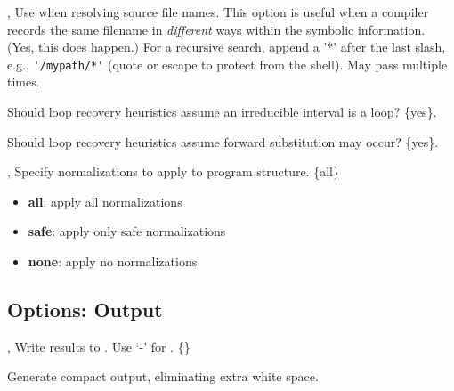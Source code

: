 \documentclass[english]{article}
\begin{document}
\begin{Description}
\item[\OptArg{-I}{path}, \OptArg{--include}{path}] 
Use  when resolving source file names. 
This option is useful when a compiler records the same filename in \emph{different} ways within the symbolic information.
(Yes, this does happen.)
For a recursive search, append a '*' after the last slash, e.g., \verb+'/mypath/*'+ (quote or escape to protect from the shell). 
May pass multiple times.

\item[\OptArg{--loop-intvl}{yes|no}]
Should loop recovery heuristics assume an irreducible interval is a loop? \{yes\}.

\item[\OptArg{--loop-fwd-subst}{yes|no}]
Should loop recovery heuristics assume forward substitution may occur? \{yes\}.

\item[\OptArg{-N}{all|safe|none}, \OptArg{--normalize}{all|safe|none}]
Specify normalizations to apply to program structure. \{all\}
  \begin{itemize}
  \item \textbf{all}: apply all normalizations
  \item \textbf{safe}: apply only safe normalizations
  \item \textbf{none}: apply no normalizations
  \end{itemize}

\end{Description}


\subsection{Options: Output}

\begin{Description}

\item[\OptArg{-o}{file}, \OptArg{--output}{file}]
Write results to .  Use `-' for . \{\}

\item[\Opt{--compact}]
Generate compact output, eliminating extra white space.


\end{Description}
\end{document}
